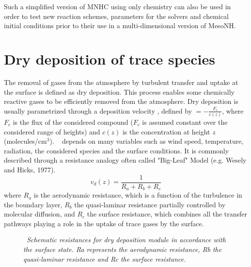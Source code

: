 Such a simplified version of MNHC using only chemistry can also be used
in order to test new reaction schemes, parameters for the solvers and
chemical initial conditions prior to their use in a multi-dimensional
version of MesoNH.
%
\section{Dry deposition of trace species}

The removal of gases from the atmosphere by turbulent transfer and uptake at
the surface is defined as dry deposition. This process enables some
chemically reactive gases to be efficiently removed from the atmosphere. 
Dry deposition is usually parametrized through a deposition velocity \vd,
defined by \vd$=-\frac{F_c}{c(z)}$, where $F_c$ is the flux of the considered
compound ($F_c$ is assumed constant over the considered range of heights) and
$c(z)$ is the concentration at height $z$ (molecules/cm$^3$). \vd~ depends
on many variables such as wind speed, temperature, radiation, the considered
species and the surface conditions. It is commonly described
through a resistance analogy often called "Big-Leaf" Model 
(e.g.  Wesely and Hicks, 1977).
\[
v_d(z)=\frac{1}{R_a+R_b+R_c}\]
where $R_a$ is the aerodynamic resistance, which is a function of the
turbulence 
in the boundary layer, $R_b$ the quasi-laminar resistance partially controlled
by molecular diffusion, and $R_c$ the surface
resistance, which combines all the transfer pathways playing a role in the
uptake of trace gases by the surface.

\begin{figure}[htb]
\centerline{}
\caption{\sl ~{Schematic resistances for dry deposition module in
accordance with the surface state. 
Ra represents the aerodynamic resistance, Rb the quasi-laminar
resistance and Rc the surface resistance.}}
\label{schema} 
\end{figure}
